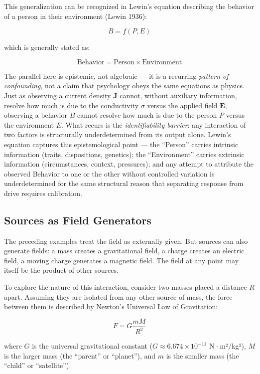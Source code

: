 \documentclass[
  letterpaper,
  DIV=11,
  numbers=noendperiod]{scrartcl}
\begin{document}
This generalization can be recognized in Lewin's equation describing the
behavior of a person in their environment (Lewin 1936):

\[B = f(P, E)\]

which is generally stated as:

\[\text{Behavior} = \text{Person} \times \text{Environment}\]

The parallel here is epistemic, not algebraic --- it is a recurring
\emph{pattern of confounding}, not a claim that psychology obeys the
same equations as physics. Just as observing a current density
\(\mathbf{J}\) cannot, without auxiliary information, resolve how much
is due to the conductivity \(\sigma\) versus the applied field
\(\mathbf{E}\), observing a behavior \(B\) cannot resolve how much is
due to the person \(P\) versus the environment \(E\). What recurs is the
\emph{identifiability barrier}: any interaction of two factors is
structurally underdetermined from its output alone. Lewin's equation
captures this epistemological point --- the ``Person'' carries intrinsic
information (traits, dispositions, genetics); the ``Environment''
carries extrinsic information (circumstances, context, pressures); and
any attempt to attribute the observed Behavior to one or the other
without controlled variation is underdetermined for the same structural
reason that separating response from drive requires calibration.

\subsection{Sources as Field
Generators}\label{sources-as-field-generators}

The preceding examples treat the field as externally given. But sources
can also generate fields: a mass creates a gravitational field, a charge
creates an electric field, a moving charge generates a magnetic field.
The field at any point may itself be the product of other sources.

To explore the nature of this interaction, consider two masses placed a
distance \(R\) apart. Assuming they are isolated from any other source
of mass, the force between them is described by Newton's Universal Law
of Gravitation:

\[F = G\frac{mM}{R^2}\]

where \(G\) is the universal gravitational constant
(\(G \approx 6.674 \times 10^{-11}\) N·m²/kg²), \(M\) is the larger mass
(the ``parent'' or ``planet''), and \(m\) is the smaller mass (the
``child'' or ``satellite'').
\end{document}
